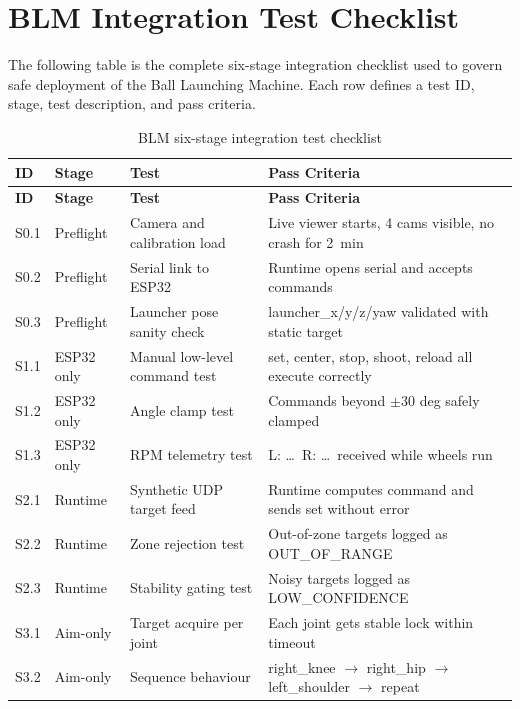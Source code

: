 \cleardoublepage
{}
\chapter{BLM Integration Test Checklist}

The following table is the complete six-stage integration checklist used to govern safe deployment of the Ball Launching Machine. Each row defines a test ID, stage, test description, and pass criteria.

{\small
\begin{longtable}{|l|l|p{4.5cm}|p{5.5cm}|}
\caption{BLM six-stage integration test checklist} \label{tab:app_a_checklist} \\
\hline
\textbf{ID} & \textbf{Stage} & \textbf{Test} & \textbf{Pass Criteria} \\
\hline
\endfirsthead
\hline
\textbf{ID} & \textbf{Stage} & \textbf{Test} & \textbf{Pass Criteria} \\
\hline
\endhead
\hline
\endfoot
S0.1 & Preflight & Camera and calibration load & Live viewer starts, 4 cams visible, no crash for 2~min \\
\hline
S0.2 & Preflight & Serial link to ESP32 & Runtime opens serial and accepts commands \\
\hline
S0.3 & Preflight & Launcher pose sanity check & launcher\_x/y/z/yaw validated with static target \\
\hline
S1.1 & ESP32 only & Manual low-level command test & set, center, stop, shoot, reload all execute correctly \\
\hline
S1.2 & ESP32 only & Angle clamp test & Commands beyond $\pm 30$ deg safely clamped \\
\hline
S1.3 & ESP32 only & RPM telemetry test & L: \ldots\ R: \ldots\ received while wheels run \\
\hline
S2.1 & Runtime & Synthetic UDP target feed & Runtime computes command and sends set without error \\
\hline
S2.2 & Runtime & Zone rejection test & Out-of-zone targets logged as OUT\_OF\_RANGE \\
\hline
S2.3 & Runtime & Stability gating test & Noisy targets logged as LOW\_CONFIDENCE \\
\hline
S3.1 & Aim-only & Target acquire per joint & Each joint gets stable lock within timeout \\
\hline
S3.2 & Aim-only & Sequence behaviour & right\_knee $\to$ right\_hip $\to$ left\_shoulder $\to$ repeat \\

\end{longtable}}
